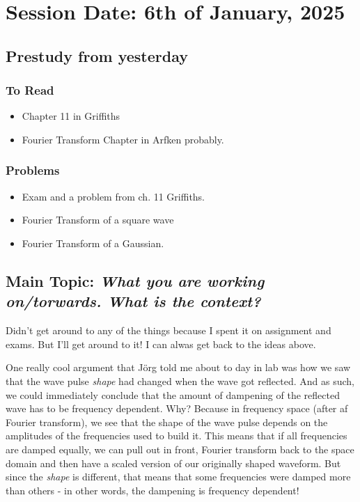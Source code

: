 \section{Session Date: 6th of January, 2025}
\subsection*{Prestudy from yesterday}
\subsubsection*{To Read}
\begin{itemize}
    \item Chapter 11 in Griffiths
    \item Fourier Transform Chapter in Arfken probably. 
\end{itemize}
\subsubsection*{Problems}
\begin{itemize}
    \item Exam and a problem from ch. 11 Griffiths.
    \item Fourier Transform of a square wave
    \item Fourier Transform of a Gaussian.
\end{itemize}

\subsection*{Main Topic: \textit{What you are working on/torwards. What is the context?}}
Didn't get around to any of the things because I spent it on assignment and exams. But I'll get around to it! I can alwas get back to the ideas above. 

One really cool argument that Jörg told me about to day in lab was how we saw that the wave pulse \textit{shape} had changed when the wave got reflected. And as such, we could immediately conclude that the amount of dampening of the reflected wave has to be frequency dependent. Why? Because in frequency space (after af Fourier transform), we see that the shape of the wave pulse depends on the amplitudes of the frequencies used to build it. This means that if all frequencies are damped equally, we can pull out in front, Fourier transform back to the space domain and then have a scaled version of our originally shaped waveform. But since the \textit{shape} is different, that means that some frequencies were damped more than others - in other words, the dampening is frequency dependent!
